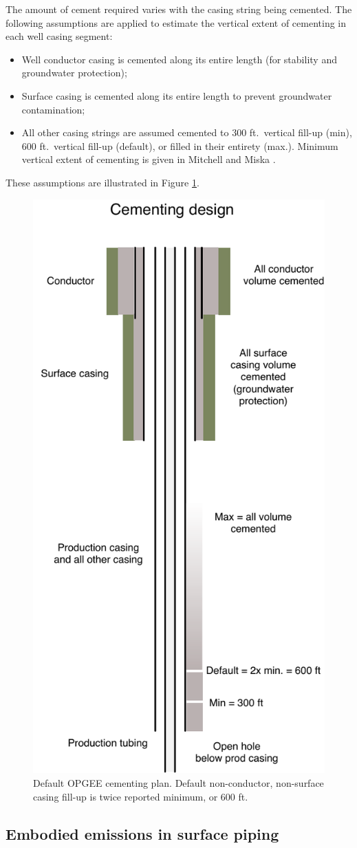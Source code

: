 \documentclass[11pt]{report}
\begin{document}
{{{{The amount of cement required varies with the casing string being cemented. The following assumptions are applied to estimate the vertical extent of cementing in each well casing segment:
\begin{itemize}
\item Well conductor casing is cemented along its entire length (for stability and groundwater protection);
\item Surface casing is cemented along its entire length to prevent groundwater contamination;
\item All other casing strings are assumed cemented to 300 ft.\ vertical fill-up (min), 600 ft.\ vertical fill-up (default), or filled in their entirety (max.). Minimum vertical extent of cementing is given in Mitchell and Miska \cite[Section 4.5.11]{Mitchell2011}.
\end{itemize}
These assumptions are illustrated in Figure \ref{fig:cement_diagram}.

\begin{figure}[t]
\includegraphics[width=0.4\columnwidth]{images/cementing_diagram.pdf}
\caption{Default OPGEE cementing plan. Default non-conductor, non-surface casing fill-up is twice reported minimum, or 600 ft.}
\label{fig:cement_diagram}
\end{figure}

\clearpage

\subsection{Embodied emissions in surface piping}

}}}}
\end{document}
